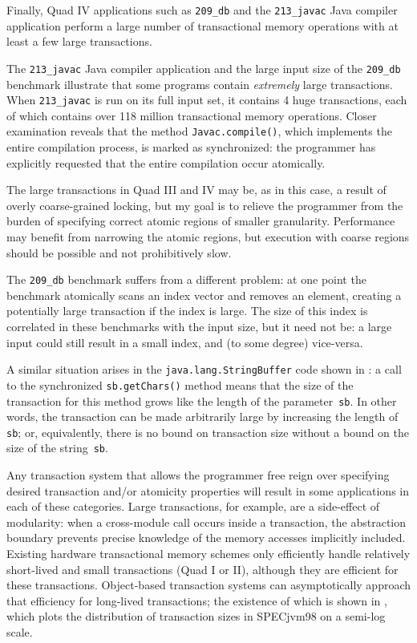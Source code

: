 Finally, Quad IV applications such as \texttt{209\_db} and the
\texttt{213\_javac} Java compiler application perform a large number
of transactional memory operations with at least a few large transactions.  

The \texttt{213\_javac} Java compiler application and the large input
size of the \texttt{209\_db} benchmark illustrate that some programs
contain \emph{extremely} large transactions.  When \texttt{213\_javac}
is run on its full input set, it contains 4 huge transactions,
each of which contains over 118 million transactional memory
operations.  Closer
examination reveals that the method \texttt{Javac.compile()}, which
implements the entire compilation process, is marked as synchronized:
the programmer has explicitly requested that the entire compilation
occur atomically.

The large transactions in Quad III and IV may be, as in this case, a result of
overly coarse-grained locking, but my goal is to
relieve the programmer from the burden of specifying correct
atomic regions of smaller granularity.  Performance may benefit from
narrowing the atomic regions, but execution with coarse regions should
be possible and not prohibitively slow.

The \texttt{209\_db} benchmark suffers from a different problem: at one
point the benchmark atomically scans an index vector and removes an
element, creating a potentially large transaction if the index is
large.  The size of this index is correlated in these benchmarks with
the input size, but it need not be: a large input could still result
in a small index, and (to some degree) vice-versa.

A similar situation arises in the {\tt java.lang.StringBuffer} code
shown in :  a call to the synchronized
\texttt{sb.getChars()} method means that
the size of the transaction for this method grows like the length
of the parameter~\texttt{sb}.  In other words, the transaction can be
made arbitrarily large by increasing the length of \texttt{sb}; or,
equivalently, there is no bound on transaction size without a bound on
the size of the string~\texttt{sb}.


Any transaction system that allows the programmer free reign over specifying
desired transaction and/or atomicity properties will result
in some applications in each of these categories.  Large transactions,
for example, are a side-effect of modularity: when a cross-module call
occurs inside a transaction, the abstraction boundary prevents precise
knowledge of the memory accesses implicitly included.  Existing
hardware transactional memory schemes only efficiently handle
relatively short-lived and small transactions (Quad I or II),
although they are efficient for these transactions.  Object-based
transaction systems can asymptotically approach that efficiency for
long-lived transactions;  the existence of which is shown in
, which plots
the distribution of transaction sizes in SPECjvm98
on a semi-log scale.


